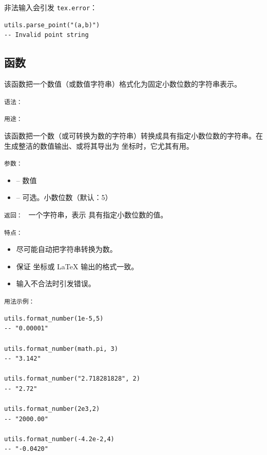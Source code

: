 非法输入会引发 \texttt{tex.error}：

\begin{verbatim}
utils.parse_point("(a,b)")
-- Invalid point string
\end{verbatim}



\subsection{函数 }
\label{sub:function_utils_format_number}

该函数把一个数值（或数值字符串）格式化为固定小数位数的字符串表示。

\texttt{语法： }

\begin{center}
\end{center}

\texttt{用途： }

该函数把一个数（或可转换为数的字符串）转换成具有指定小数位数的字符串。在生成整洁的数值输出、或将其导出为 \TIKZ{} 坐标时，它尤其有用。

\texttt{参数： }

\begin{itemize}
\item {} – 数值
\item {} – 可选。小数位数（默认：5）
\end{itemize}

\texttt{返回： } 一个字符串，表示  具有指定小数位数的值。

\texttt{特点： }

\begin{itemize}
\item 尽可能自动把字符串转换为数。
\item 保证 \TIKZ{} 坐标或 LaTeX 输出的格式一致。
\item 输入不合法时引发错误。
\end{itemize}

\texttt{用法示例： }

\begin{verbatim}
utils.format_number(1e-5,5)
-- "0.00001"

utils.format_number(math.pi, 3)
-- "3.142"

utils.format_number("2.718281828", 2)
-- "2.72"

utils.format_number(2e3,2)
-- "2000.00"

utils.format_number(-4.2e-2,4)
-- "-0.0420"
\end{verbatim}


